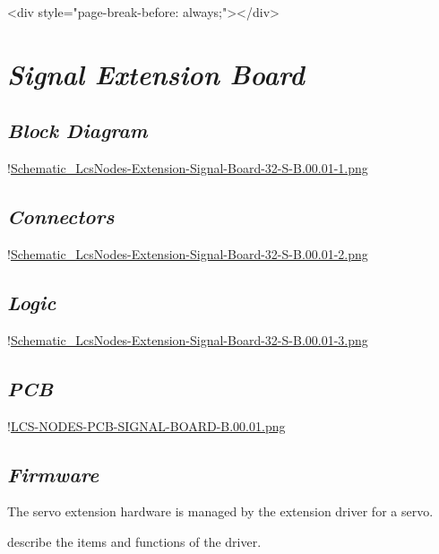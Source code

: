 <div style="page-break-before: always;"></div>

\chapter{\textit{Signal Extension Board}}

\section{\textit{Block Diagram}}

!\href{./Schematics/Schematic_LcsNodes-Extension-Signal-Board-32-S-B.00.01-1.png }{Schematic_LcsNodes-Extension-Signal-Board-32-S-B.00.01-1.png}

\section{\textit{Connectors}}

!\href{./Schematics/Schematic_LcsNodes-Extension-Signal-Board-32-S-B.00.01-2.png }{Schematic_LcsNodes-Extension-Signal-Board-32-S-B.00.01-2.png}

\section{\textit{Logic}}

!\href{./Schematics/Schematic_LcsNodes-Extension-Signal-Board-32-S-B.00.01-3.png }{Schematic_LcsNodes-Extension-Signal-Board-32-S-B.00.01-3.png}

\section{\textit{PCB}}

!\href{./Schematics/LCS-NODES-PCB-SIGNAL-BOARD-B.00.01.png }{LCS-NODES-PCB-SIGNAL-BOARD-B.00.01.png}

\section{\textit{Firmware}}

The servo extension hardware is managed by the extension driver for a servo.
\item describe the items and functions of the driver.